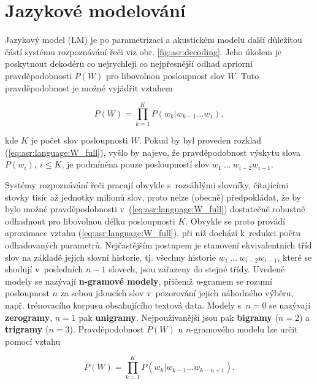 \section{Jazykové modelování}
\label{chap:asr:language}

Jazykový model (LM) je po parametrizaci a akustickém modelu další důležitou částí systému rozpoznávání řeči viz obr. \ref{fig:asr:decoding}. Jeho úkolem je poskytnout dekodéru co nejrychleji co nejpřesnější odhad apriorní pravděpodobnosti $P\left(W\right)$ pro libovolnou posloupnost slov $W$. Tuto pravděpodobnost je možné vyjádřit vztahem

\begin{equation}
  P\left(W\right) = \prod_{k=1}^{K} P\left(w_k | w_{k-1}\dots w_{1}\right),
  \label{eq:asr:language:W_full}
\end{equation}

\noindent kde $K$ je počet slov posloupnosti $W$. Pokud by byl proveden rozklad (\ref{eq:asr:language:W_full}), vyšlo by najevo, že pravděpodobnost výskytu slova $P\left(w_i\right),\ i \leq K$, je podmíněna pouze posloupností slov $w_1\ \dots\ w_{i-2}w_{i-1}$.

Systémy rozpoznávání řeči pracují obvykle s~rozsáhlými slovníky, čítajícími stovky tisíc až jednotky milionů slov, proto nelze (obecně) předpokládat, že by bylo možné pravděpodobnosti v~(\ref{eq:asr:language:W_full}) dostatečně robustně odhadnout pro libovolnou délku posloupnosti $K$.
Obvykle se proto provádí aproximace vztahu (\ref{eq:asr:language:W_full}), při níž dochází k~redukci počtu odhadovaných parametrů. Nejčastějším postupem je stanovení ekvivalentních tříd slov na základě jejich slovní historie, tj. všechny historie $w_1\ \dots\ w_{i-2}w_{i-1}$, které se shodují v~posledních $n-1$ slovech, jsou zařazeny do stejné třídy. Uvedené modely se nazývají \textbf{n-gramové modely}, přičemž \textit{n}-gramem se rozumí posloupnost $n$ za sebou jdoucích slov v~pozorování jejich náhodného výběru, např. trénovacího korpusu obsahujícího textová data. Modely s~$n=0$ se nazývají \textbf{zerogramy}, $n=1$ pak \textbf{unigramy}. Nejpoužívanější jsou pak \textbf{bigramy} ($n=2$) a \textbf{trigramy} ($n=3$). Pravděpodobnost $P\left(W\right)$ u $n$-gramového modelu lze určit pomocí vztahu

\begin{equation}
  P\left(W\right) = \prod_{k=1}^{K} P\left(w_k | w_{k-1}\dots w_{k-n+1}\right).
  \label{eq:asr:language:W}
\end{equation}

